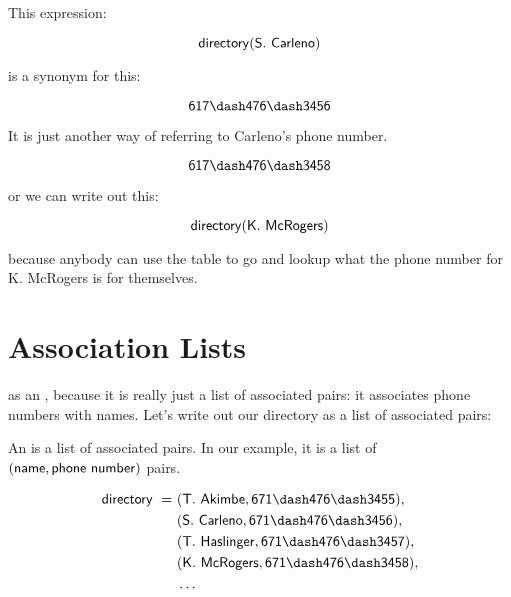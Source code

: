 \documentclass[../../../main.tex]{subfiles}
\begin{document}
\begin{aside}
  \begin{example}
    This expression:
    
    \begin{equation*}
      \mathsf{directory(S.~Carleno)}
    \end{equation*}
    
    is a synonym for this:
    
    \begin{equation*}
      \e{617\dash476\dash3456}
    \end{equation*}
    
    It is just another way of referring to Carleno's phone number.
  \end{example}
\end{aside}

\begin{equation*}
  \e{617\dash476\dash3458}
\end{equation*}

\noindent
or we can write out this:

\begin{equation*}
  \mathsf{directory(K.~McRogers)}
\end{equation*}

\noindent
because anybody can use the table to go and lookup what the phone number for K. McRogers is for themselves.



\section{Association Lists}

 as an , because it is really just a list of associated pairs: it associates phone numbers with names. Let's write out our directory as a list of associated pairs:

\begin{terminology}
  An  is a list of associated pairs. In our example, it is a list of $\mathsf{(name, phone~number)}$ pairs.
\end{terminology}

\begin{align*}
  \e{directory~=~}&\e{(T.~Akimbe, 671\dash476\dash3455),} \\
    &\e{(S.~Carleno, 671\dash476\dash3456),} \\
    &\e{(T.~Haslinger, 671\dash476\dash3457),} \\
    &\e{(K.~McRogers, 671\dash476\dash3458),} \\
    &\ldots
\end{align*}
\end{document}
